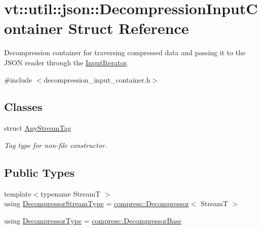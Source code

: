 \hypertarget{structvt_1_1util_1_1json_1_1_decompression_input_container}{}\section{vt\+:\+:util\+:\+:json\+:\+:Decompression\+Input\+Container Struct Reference}
\label{structvt_1_1util_1_1json_1_1_decompression_input_container}


Decompression container for traversing compressed data and passing it to the J\+S\+ON reader through the {\ttfamily \hyperlink{structvt_1_1util_1_1json_1_1_input_iterator}{Input\+Iterator}}.  




{\ttfamily \#include $<$decompression\+\_\+input\+\_\+container.\+h$>$}

\subsection*{Classes}
\begin{DoxyCompactItemize}
\item 
struct \hyperlink{structvt_1_1util_1_1json_1_1_decompression_input_container_1_1_any_stream_tag}{Any\+Stream\+Tag}
\begin{DoxyCompactList}\small\item\em Tag type for non-\/file constructor. \end{DoxyCompactList}\end{DoxyCompactItemize}
\subsection*{Public Types}
\begin{DoxyCompactItemize}
\item 
{\footnotesize template$<$typename StreamT $>$ }\\using \hyperlink{structvt_1_1util_1_1json_1_1_decompression_input_container_a9e2a25dd33b20d6c2fcdb356a19f2dbb}{Decompressor\+Stream\+Type} = \hyperlink{structvt_1_1util_1_1compress_1_1_decompressor}{compress\+::\+Decompressor}$<$ StreamT $>$
\item 
using \hyperlink{structvt_1_1util_1_1json_1_1_decompression_input_container_acb359b166e7b6db21c74da16d8207ef4}{Decompressor\+Type} = \hyperlink{structvt_1_1util_1_1compress_1_1_decompressor_base}{compress\+::\+Decompressor\+Base}
\end{DoxyCompactItemize}
